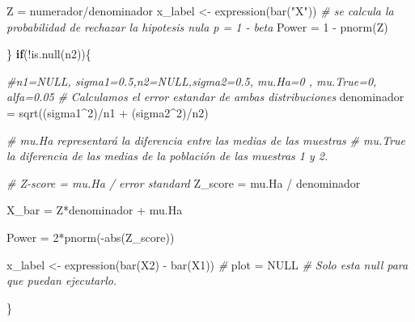\documentclass[]{article}
\newenvironment{Shaded}{\begin{snugshade}}{\end{snugshade}}
\newcommand{\CommentTok}[1]{\textcolor[rgb]{0.56,0.35,0.01}{\textit{#1}}}
\newcommand{\ConstantTok}[1]{\textcolor[rgb]{0.00,0.00,0.00}{#1}}
\newcommand{\ControlFlowTok}[1]{\textcolor[rgb]{0.13,0.29,0.53}{\textbf{#1}}}
\newcommand{\DecValTok}[1]{\textcolor[rgb]{0.00,0.00,0.81}{#1}}
\newcommand{\FunctionTok}[1]{\textcolor[rgb]{0.00,0.00,0.00}{#1}}
\newcommand{\NormalTok}[1]{#1}
\newcommand{\OtherTok}[1]{\textcolor[rgb]{0.56,0.35,0.01}{#1}}
\newcommand{\SpecialCharTok}[1]{\textcolor[rgb]{0.00,0.00,0.00}{#1}}
\newcommand{\StringTok}[1]{\textcolor[rgb]{0.31,0.60,0.02}{#1}}
\begin{document}
\begin{Shaded}
\begin{Highlighting}[]
\NormalTok{    Z }\OtherTok{=}\NormalTok{ numerador}\SpecialCharTok{/}\NormalTok{denominador}
\NormalTok{    x\_label }\OtherTok{\textless{}{-}} \FunctionTok{expression}\NormalTok{(}\FunctionTok{bar}\NormalTok{(}\StringTok{"X"}\NormalTok{))}
    \CommentTok{\# se calcula la probabilidad de rechazar la hipotesis nula p = 1 {-} beta}
\NormalTok{    Power }\OtherTok{=} \DecValTok{1} \SpecialCharTok{{-}} \FunctionTok{pnorm}\NormalTok{(Z)}
    

\NormalTok{  \}}
  \ControlFlowTok{if}\NormalTok{(}\SpecialCharTok{!}\FunctionTok{is.null}\NormalTok{(n2))\{}
    
    \CommentTok{\#n1=NULL, sigma1=0.5,n2=NULL,sigma2=0.5, mu.Ha=0 , mu.True=0, alfa=0.05}
    \CommentTok{\# Calculamos el error estandar de ambas distribuciones}
\NormalTok{    denominador }\OtherTok{=} \FunctionTok{sqrt}\NormalTok{((sigma1}\SpecialCharTok{\^{}}\DecValTok{2}\NormalTok{)}\SpecialCharTok{/}\NormalTok{n1 }\SpecialCharTok{+}\NormalTok{ (sigma2}\SpecialCharTok{\^{}}\DecValTok{2}\NormalTok{)}\SpecialCharTok{/}\NormalTok{n2)}
    
    \CommentTok{\# mu.Ha representará la diferencia entre las medias de las muestras}
    \CommentTok{\# mu.True la diferencia de las medias de la población de las muestras 1 y 2.}
    
    \CommentTok{\# Z{-}score = mu.Ha / error standard}
\NormalTok{      Z\_score }\OtherTok{=}\NormalTok{ mu.Ha }\SpecialCharTok{/}\NormalTok{ denominador}
      
\NormalTok{      X\_bar }\OtherTok{=}\NormalTok{ Z}\SpecialCharTok{*}\NormalTok{denominador }\SpecialCharTok{+}\NormalTok{ mu.Ha}
      
\NormalTok{      Power }\OtherTok{=} \DecValTok{2}\SpecialCharTok{*}\FunctionTok{pnorm}\NormalTok{(}\SpecialCharTok{{-}}\FunctionTok{abs}\NormalTok{(Z\_score))}
    
\NormalTok{      x\_label }\OtherTok{\textless{}{-}} \FunctionTok{expression}\NormalTok{(}\FunctionTok{bar}\NormalTok{(X2) }\SpecialCharTok{{-}} \FunctionTok{bar}\NormalTok{(X1))}
    \CommentTok{\# }
\NormalTok{    plot }\OtherTok{=} \ConstantTok{NULL} \CommentTok{\# Solo esta null para que puedan ejecutarlo.}
  
\NormalTok{  \}}
    

\end{Highlighting}
\end{Shaded}
\end{document}
